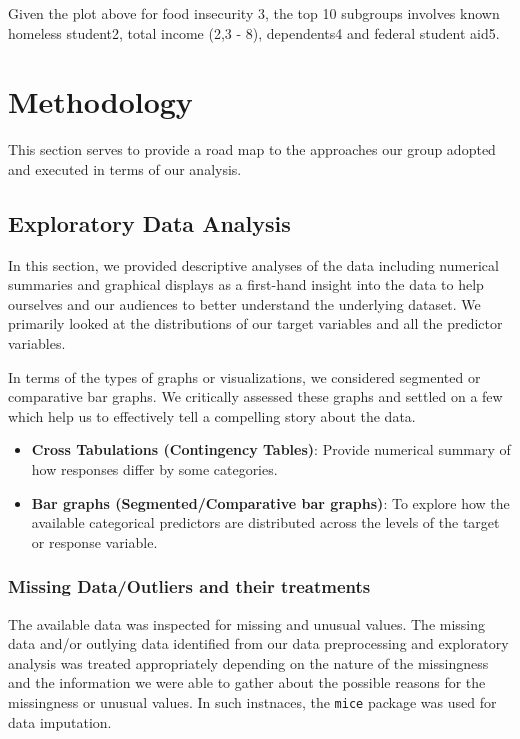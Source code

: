\documentclass[
  10pt,
]{article}
\begin{document}
Given the plot above for food insecurity 3, the top 10 subgroups involves known homeless student2, total income (2,3 - 8), dependents4 and federal student aid5.

\section{Methodology}

This section serves to provide a road map to the approaches our group adopted and executed in terms of our analysis.

\subsection{Exploratory Data Analysis}

In this section, we provided descriptive analyses of the data including numerical summaries and graphical displays as a first-hand insight into the data to help ourselves and our audiences to better understand the underlying dataset. We primarily looked at the distributions of our target variables and all the predictor variables.

In terms of the types of graphs or visualizations, we considered segmented or comparative bar graphs. We critically assessed these graphs and settled on a few which help us to effectively tell a compelling story about the data.

\begin{itemize}
\item
  \textbf{Cross Tabulations (Contingency Tables)}: Provide numerical summary of how responses differ by some categories.
\item
  \textbf{Bar graphs (Segmented/Comparative bar graphs)}: To explore how the available categorical predictors are distributed across the levels of the target or response variable.
\end{itemize}

\hypertarget{missing-dataoutliers-and-their-treatments}{%
\subsubsection{Missing Data/Outliers and their treatments}\label{missing-dataoutliers-and-their-treatments}}

The available data was inspected for missing and unusual values. The missing data and/or outlying data identified from our data preprocessing and exploratory analysis was treated appropriately depending on the nature of the missingness and the information we were able to gather about the possible reasons for the missingness or unusual values. In such instnaces, the \texttt{mice} package was used for data imputation.
\end{document}
